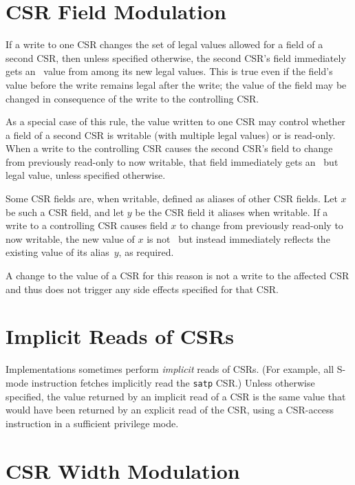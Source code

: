 \section{CSR Field Modulation}

If a write to one CSR changes the set of legal values allowed for a
field of a second CSR, then unless specified otherwise, the second
CSR's field immediately gets an \unspecified\ value from among its new
legal values.
This is true even if the field's value before the write remains legal
after the write;
the value of the field may be changed in consequence of the write to
the controlling CSR.

\begin{commentary}
As a special case of this rule, the value written to one CSR may
control whether a field of a second CSR is writable (with multiple
legal values) or is read-only.
When a write to the controlling CSR causes the second CSR's field
to change from previously read-only to now writable, that field
immediately gets an \unspecified\ but legal value, unless specified
otherwise.
\end{commentary}

\begin{commentary}
Some CSR fields are, when writable, defined as aliases of other CSR
fields.
Let $x$ be such a CSR field, and let $y$ be the CSR field it aliases
when writable.
If a write to a controlling CSR causes field $x$ to change from
previously read-only to now writable, the new value of $x$ is not
\unspecified\ but instead immediately reflects the existing value of its
alias~$y$, as required.
\end{commentary}

A change to the value of a CSR for this reason is not a write to the
affected CSR and thus does not trigger any side effects specified for
that CSR.

\section{Implicit Reads of CSRs}

Implementations sometimes perform {\em implicit} reads of CSRs.
(For example, all S-mode instruction fetches implicitly read the {\tt satp}
CSR.)
Unless otherwise specified, the value returned by an implicit read of a CSR
is the same value that would have been returned by an explicit read of the
CSR, using a CSR-access instruction in a sufficient privilege mode.

\section{CSR Width Modulation}
\label{sec:csrwidthmodulation}

